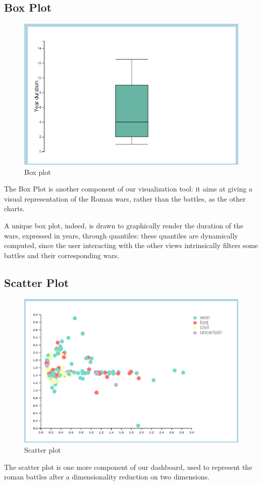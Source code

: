 \subsection{Box Plot}
\begin{figure}[h]
    \centering
    \includegraphics[scale=0.5]{./images/box_plot.png}
    \caption{Box plot}
\end{figure}
The Box Plot is another component of our visualization tool: it aims at giving a visual representation of the Roman wars, rather than the battles, as the other charts.

A unique box plot, indeed, is drawn to graphically render the duration of the wars, expressed in years, through quantiles: these quantiles are dynamically computed, since the user interacting with the other views intrinsically filters some battles and their corresponding wars.

\subsection{Scatter Plot}
\begin{figure}[h]
    \centering
    \includegraphics[scale=0.30]{./images/scatter_plot.png}
    \caption{Scatter plot}
\end{figure}
The scatter plot is one more component of our dashboard, used to represent the roman battles after a dimensionality reduction on two dimensions.

